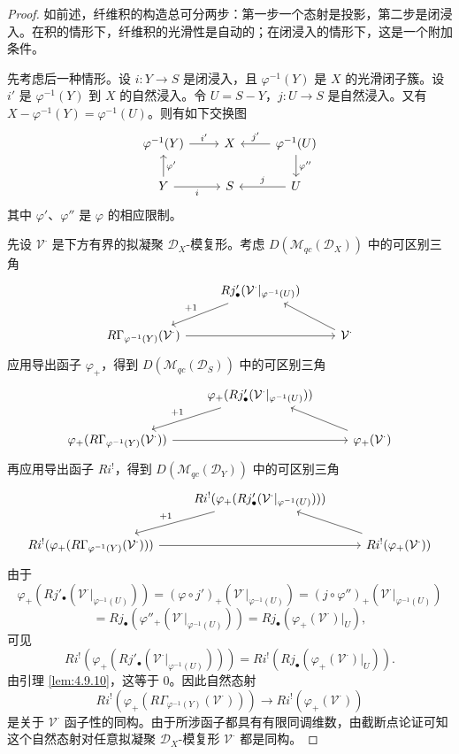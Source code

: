 \begin{proof}
如前述，纤维积的构造总可分两步：第一步一个态射是投影，第二步是闭浸入。在积的情形下，纤维积的光滑性是自动的；在闭浸入的情形下，这是一个附加条件。

先考虑后一种情形。设 $i:Y\to S$ 是闭浸入，且 $\varphi^{-1}(Y)$ 是 $X$ 的光滑闭子簇。设 $i'$ 是 $\varphi^{-1}(Y)$ 到 $X$ 的自然浸入。令 $U=S-Y$，$j:U\to S$ 是自然浸入。又有 $X-\varphi^{-1}(Y)=\varphi^{-1}(U)$。则有如下交换图
$$\begin{tikzcd}
\varphi^{-1}(Y) \arrow[r,"i'"] & X & \arrow[l,"j'"'] \varphi^{-1}(U) \arrow[d,"\varphi''"]\\
Y \arrow[r,"i"'] \arrow[u,"\varphi'"'] & S & \arrow[l,"j"'] U
\end{tikzcd}$$
其中 $\varphi'$、$\varphi''$ 是 $\varphi$ 的相应限制。

先设 $\mathcal{V}^\cdot$ 是下方有界的拟凝聚 $\mathcal{D}_X$-模复形。考虑 $D(\mathcal{M}_{qc}(\mathcal{D}_X))$ 中的可区别三角
$$\begin{tikzcd}
& Rj'_\bullet(\mathcal{V}^\cdot|_{\varphi^{-1}(U)}) \arrow[dl,"+1"'] & \\
R\Gamma_{\varphi^{-1}(Y)}(\mathcal{V}^\cdot) \arrow[rr] && \mathcal{V}^\cdot \arrow[lu]
\end{tikzcd}$$
应用导出函子 $\varphi_+$，得到 $D(\mathcal{M}_{qc}(\mathcal{D}_S))$ 中的可区别三角
$$\begin{tikzcd}
& \varphi_+(Rj'_\bullet(\mathcal{V}^\cdot|_{\varphi^{-1}(U)})) \arrow[dl,"+1"'] & \\
\varphi_+(R\Gamma_{\varphi^{-1}(Y)}(\mathcal{V}^\cdot)) \arrow[rr] && \varphi_+(\mathcal{V}^\cdot) \arrow[lu]
\end{tikzcd}$$
再应用导出函子 $Ri^!$，得到 $D(\mathcal{M}_{qc}(\mathcal{D}_Y))$ 中的可区别三角
$$\begin{tikzcd}
& Ri^!(\varphi_+(Rj'_\bullet(\mathcal{V}^\cdot|_{\varphi^{-1}(U)}))) \arrow[dl,"+1"'] & \\
Ri^!(\varphi_+(R\Gamma_{\varphi^{-1}(Y)}(\mathcal{V}^\cdot))) \arrow[rr] && Ri^!(\varphi_+(\mathcal{V}^\cdot)) \arrow[lu]
\end{tikzcd}$$
由于
$$\varphi_+(Rj'_\bullet(\mathcal{V}^\cdot|_{\varphi^{-1}(U)}))
=(\varphi\circ j')_+(\mathcal{V}^\cdot|_{\varphi^{-1}(U)})
=(j\circ\varphi'')_+(\mathcal{V}^\cdot|_{\varphi^{-1}(U)})$$
$$=Rj_\bullet(\varphi''_+(\mathcal{V}^\cdot|_{\varphi^{-1}(U)}))=Rj_\bullet(\varphi_+(\mathcal{V}^\cdot)|_U),$$
可见
$$Ri^!(\varphi_+(Rj'_\bullet(\mathcal{V}^\cdot|_{\varphi^{-1}(U)})))=Ri^!(Rj_\bullet(\varphi_+(\mathcal{V}^\cdot)|_U)).$$
由引理 \ref{lem:4.9.10}，这等于 0。因此自然态射
$$Ri^!(\varphi_+(R\Gamma_{\varphi^{-1}(Y)}(\mathcal{V}^\cdot)))\longrightarrow Ri^!(\varphi_+(\mathcal{V}^\cdot))$$
是关于 $\mathcal{V}^\cdot$ 函子性的同构。由于所涉函子都具有有限同调维数，由截断点论证可知这个自然态射对任意拟凝聚 $\mathcal{D}_X$-模复形 $\mathcal{V}^\cdot$ 都是同构。


\end{proof}
